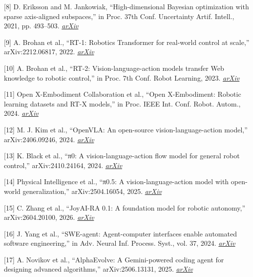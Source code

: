 {{\RaggedRight
\protect\hypertarget{ref_8}{}{}{[}8{]} D. Eriksson and M. Jankowiak,
``High-dimensional Bayesian optimization with sparse axis-aligned
subspaces,'' in Proc. 37th Conf. Uncertainty Artif. Intell., 2021, pp.
493--503. \href{https://arxiv.org/abs/2103.00349}{\emph{arXiv}}\par}

\protect\hypertarget{ref_9}{}{}{[}9{]} A. Brohan et al., ``RT-1:
Robotics Transformer for real-world control at scale,''
arXiv:2212.06817, 2022.
\href{https://arxiv.org/abs/2212.06817}{\emph{arXiv}}

\protect\hypertarget{ref_10}{}{}{[}10{]} A. Brohan et al., ``RT-2:
Vision-language-action models transfer Web knowledge to robotic
control,'' in Proc. 7th Conf. Robot Learning, 2023.
\href{https://arxiv.org/abs/2307.15818}{\emph{arXiv}}

\protect\hypertarget{ref_11}{}{}{[}11{]} Open X-Embodiment Collaboration
et al., ``Open X-Embodiment: Robotic learning datasets and RT-X
models,'' in Proc. IEEE Int. Conf. Robot. Autom., 2024.
\href{https://arxiv.org/abs/2310.08864}{\emph{arXiv}}

\protect\hypertarget{ref_12}{}{}{[}12{]} M. J. Kim et al., ``OpenVLA: An
open-source vision-language-action model,'' arXiv:2406.09246, 2024.
\href{https://arxiv.org/abs/2406.09246}{\emph{arXiv}}

\protect\hypertarget{ref_13}{}{}{[}13{]} K. Black et al., ``π0: A
vision-language-action flow model for general robot control,''
arXiv:2410.24164, 2024.
\href{https://arxiv.org/abs/2410.24164}{\emph{arXiv}}

\protect\hypertarget{ref_14}{}{}{[}14{]} Physical Intelligence et al.,
``π0.5: A vision-language-action model with open-world generalization,''
arXiv:2504.16054, 2025.
\href{https://arxiv.org/abs/2504.16054}{\emph{arXiv}}

\protect\hypertarget{ref_15}{}{}{[}15{]} C. Zhang et al., ``JoyAI-RA
0.1: A foundation model for robotic autonomy,'' arXiv:2604.20100, 2026.
\href{https://arxiv.org/abs/2604.20100}{\emph{arXiv}}

\protect\hypertarget{ref_16}{}{}{[}16{]} J. Yang et al., ``SWE-agent:
Agent-computer interfaces enable automated software engineering,'' in
Adv. Neural Inf. Process. Syst., vol. 37, 2024.
\href{https://arxiv.org/abs/2405.15793}{\emph{arXiv}}

{\fontsize{9.15}{10.6}\selectfont
\protect\hypertarget{ref_17}{}{}{[}17{]} A. Novikov et al.,
``AlphaEvolve: A Gemini-powered coding agent for designing advanced
algorithms,'' arXiv:2506.13131, 2025.
\href{https://arxiv.org/abs/2506.13131}{\emph{arXiv}}\par}

}
